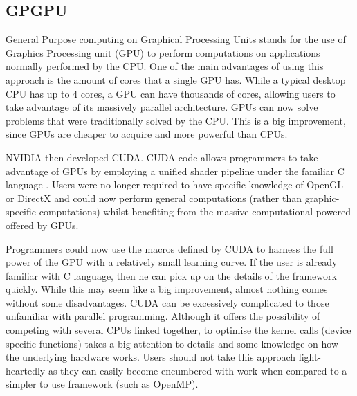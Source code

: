 \documentclass[12pt, openany]{book}
\begin{document}
\subsection{GPGPU}

General Purpose computing on Graphical Processing Units stands for the use of Graphics Processing unit (GPU) to perform computations on applications normally performed by the CPU. One of the main advantages of using this approach is the amount of cores that a single GPU has. While a typical desktop CPU has up to 4 cores, a GPU can have thousands of cores, allowing users to take advantage of its massively parallel architecture. GPUs can now solve problems that were traditionally solved by the CPU. This is a big improvement, since GPUs are cheaper to acquire and more powerful than CPUs.\par
	NVIDIA then developed CUDA. CUDA code allows programmers to take advantage of GPUs by employing a unified shader pipeline under the familiar C language \cite{cuda_by_example}. Users were no longer required to have specific knowledge of OpenGL or DirectX and could now perform general computations (rather than graphic-specific computations) whilst benefiting from the massive computational powered offered by GPUs. 
	\par Programmers could now use the macros defined by CUDA to harness the full power of the GPU with a relatively small learning curve. If the user is already familiar with C language, then he can pick up on the details of the framework quickly. While this may seem like a big improvement, almost nothing comes without some disadvantages. CUDA can be excessively complicated to those unfamiliar with parallel programming. Although it offers the possibility of competing with several CPUs linked together, to optimise the kernel calls (device specific functions) takes a big attention to details and some knowledge on how the underlying hardware works. Users should not take this approach light-heartedly as they can easily become encumbered with work when compared to a simpler to use framework (such as OpenMP).  
\end{document}
